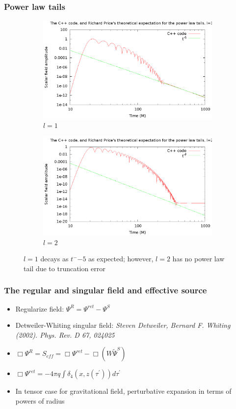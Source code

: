 \documentclass{beamer}
\begin{document}
\begin{frame}
  \frametitle{Power law tails}
  \begin{figure}
    \centering
    \begin{subfigure}{.45\textwidth}
      \centering
      \includegraphics[width=\textwidth]{l1m1tail2}
      \caption{$l=1$}
  \end{subfigure}
    \begin{subfigure}{.45\textwidth}
      \centering
      \includegraphics[width=\textwidth]{l2m2tailfail2}
      \caption{$l=2$}
    \end{subfigure}
  \caption{$l=1$ decays as $t^-{-5}$ as expected; however, $l=2$ has no power law tail due to truncation error}
  \end{figure}
\end{frame}



\begin{frame}
  \frametitle{The regular and singular field and effective source}
  \begin{itemize}
    \item Regularize field: $\Psi^R=\Psi^{ret}-\Psi^S$
  \item Detweiler-Whiting singular field: {\em Steven Detweiler, Bernard F. Whiting (2002). Phys. Rev. D 67, 024025}
  \item $\Box\Psi^R=S_{eff}=\Box\Psi^{ret}-\Box(W\tilde{\Psi}^S)$
  \item$\Box\Psi^{ret}=-4\pi q\int\delta_4(x,z(\tau^\prime))d\tau^\prime$
    \item In tensor case for gravitational field, perturbative expansion in terms of powers of radius
  \end{itemize}
\end{frame}
\end{document}
